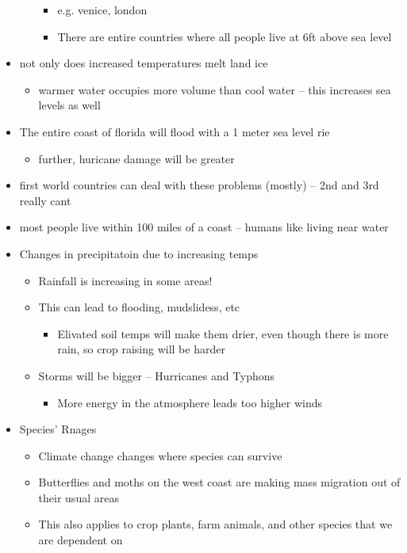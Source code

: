 \documentclass{article}
\theoremstyle{definition}
\begin{document}
\begin{itemize}
\begin{itemize}
\begin{itemize}
					\item e.g. venice, london
					\item There are entire countries where all people live at 6ft above sea level
				\end{itemize}
		\end{itemize}
	\item not only does increased temperatures melt land ice
		\begin{itemize}
			\item warmer water occupies more volume than cool water -- this increases sea levels as well
		\end{itemize}
	\item The entire coast of florida will flood with a 1 meter sea level rie
		\begin{itemize}
			\item further, huricane damage will be greater
		\end{itemize}
	\item first world countries can deal with these problems (mostly) -- 2nd and 3rd really cant
	\item most people live within 100 miles of a coast -- humans like living near water
	\item Changes in precipitatoin due to increasing temps
		\begin{itemize}
			\item Rainfall is increasing in some areas!
			\item This can lead to flooding, mudslidess, etc
				\begin{itemize}
					\item Elivated soil temps will make them drier, even though there is more rain, so crop raising will be harder
				\end{itemize}
			\item Storms will be bigger -- Hurricanes and Typhons
				\begin{itemize}
					\item More energy in the atmosphere leads too higher winds
				\end{itemize}
		\end{itemize}
	\item Species' Rnages 
		\begin{itemize}
			\item Climate change changes where species can survive
			\item Butterflies and moths on the west coast are making mass migration out of their usual areas
			\item This also applies to crop plants, farm animals, and other species that we are dependent on

\end{itemize}
\end{itemize}
\end{document}

